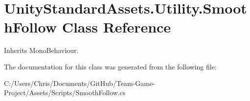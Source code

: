 \hypertarget{class_unity_standard_assets_1_1_utility_1_1_smooth_follow}{}\section{Unity\+Standard\+Assets.\+Utility.\+Smooth\+Follow Class Reference}
\label{class_unity_standard_assets_1_1_utility_1_1_smooth_follow}


Inherits Mono\+Behaviour.



The documentation for this class was generated from the following file\+:\begin{DoxyCompactItemize}
\item 
C\+:/\+Users/\+Chris/\+Documents/\+Git\+Hub/\+Team-\/\+Game-\/\+Project/\+Assets/\+Scripts/Smooth\+Follow.\+cs\end{DoxyCompactItemize}
